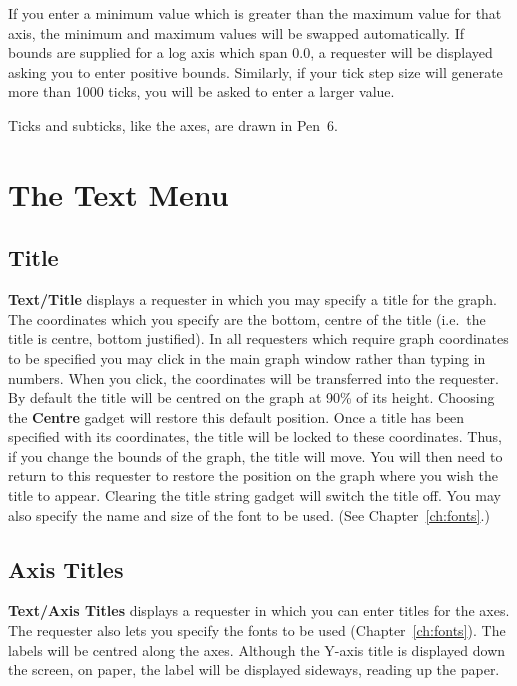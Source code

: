 If you enter a minimum value which is greater than the maximum value for that axis, 
the minimum and maximum values will be swapped automatically. If bounds are 
supplied for a log axis which span 0.0, a requester will be displayed asking you to 
enter positive bounds. Similarly, if your tick step size will generate more than 
1000 ticks, you will be asked to enter a larger value.

Ticks and subticks, like the axes, are drawn in Pen~6.

\section{The Text Menu}

\subsection{Title}
{\bf Text/Title}  displays a requester in which you may specify 
a title for the graph. 
The coordinates which you specify are the bottom, centre of the title (i.e.\ the 
title is centre, bottom justified). In all requesters which require graph coordinates
to be specified you may click in the main graph window rather than typing in numbers.
When you click, the coordinates will be transferred into the requester.
By default the title will be centred on the 
graph at 90\% of its height. Choosing the {\bf Centre} gadget will restore this 
default position. Once a title has been specified with its coordinates, the title 
will be locked to these coordinates. Thus, if you change the bounds of the graph, 
the title will move. You will then need to return to this requester to restore 
the position on the graph where you wish the title to appear. Clearing the title 
string gadget will switch the title off. You may also specify the name and size
of the font to be used. (See Chapter~\ref{ch:fonts}.)


\subsection{Axis Titles}
{\bf Text/Axis Titles}  displays a requester in which you can 
enter titles for the axes. The requester also lets you specify the fonts to be used
(Chapter~\ref{ch:fonts}).
The labels will be centred along the axes. Although the Y-axis title is displayed 
down the screen, on paper, the label will be displayed sideways, reading up the paper.



